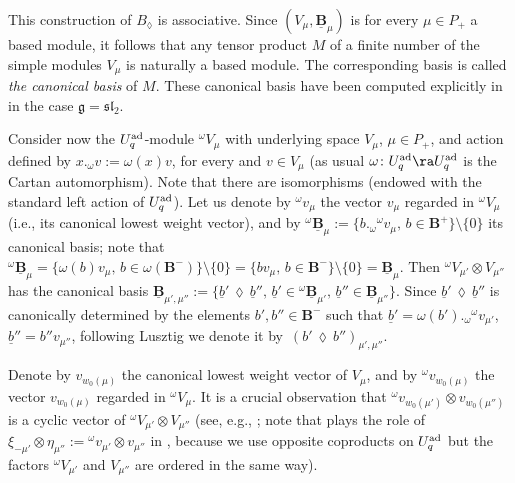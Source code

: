 This construction of $B_{\lozenge}$ is associative. Since $(V_\mu, \underline{\mathbf{B}}_{\mu})$ is for every $\mu\in P_+$ a based module, it follows that any tensor product $M$ of a finite number of the simple modules $V_\mu$ is naturally a based module. The corresponding basis is called {\it the canonical basis} of $M$. These canonical basis have been computed explicitly in \cite{FK} in the case $\mathfrak{g}={\mathfrak{sl}_2}$.

Consider now the $U_q^{\rm ad}$-module ${}^{\omega}V_{\mu}$ with underlying space $V_{\mu}$, $\mu\in P_+$, and action defined by $x._{\omega} v := \omega(x)v$, for every  and $v\in V_{\mu}$ (as usual $\omega\colon U_q^{\rm ad} \ra U_q^{\rm ad}$ is the Cartan automorphism). Note that there are isomorphisms  (endowed with the standard left action of $U_q^{\rm ad}$). Let us denote by ${}^\omega v_\mu$ the vector $v_\mu$ regarded in ${}^{\omega}V_{\mu}$ (i.e., its canonical lowest weight vector), and by ${}^\omega\underline{\mathbf{B}}_{\mu}:=\{b._{\omega}{}^\omega v_{\mu},\, b\in \mathbf{B}^+\}\setminus \{0\}$ its canonical basis; note that ${}^\omega\underline{\mathbf{B}}_{\mu} = \{\omega(b){}v_{\mu},\, b\in \omega(\mathbf{B}^-)\}\setminus \{0\} = \{b v_{\mu},\, b\in \mathbf{B}^-\}\setminus \{0\} = \underline{\mathbf{B}}_{\mu}$. Then ${}^{\omega}V_{\mu'}\otimes V_{\mu''}$ has the canonical basis $\underline{\mathbf{B}}_{\mu',\mu''} := \{\underline{b}'\,\lozenge\, \underline{b}'', \, \underline{b}'\in {}^\omega\underline{\mathbf{B}}_{\mu'},\, \underline{b}''\in \underline{\mathbf{B}}_{\mu''}\}$. Since $\underline{b}'\,\lozenge\, \underline{b}''$ is canonically determined by the elements $b' ,b''\in \mathbf{B}^-$ such that $\underline{b}' = \omega(b')._{\omega} {}^\omega v_{\mu'}$, $\underline{b}'' = b''v_{\mu''}$, following Lusztig we denote it by~${(b' \,\lozenge\, b'')_{\mu',\mu''}}$.

 Denote by $v_{w_0(\mu)}$ the canonical lowest weight vector of $V_{\mu}$, and by ${}^\omega v_{w_0(\mu)}$ the vector $v_{w_0(\mu)}$ regarded in ${}^{\omega}V_{\mu}$. It is a crucial observation that ${}^\omega v_{w_0(\mu')}\otimes v_{w_0(\mu'')}$ is a cyclic vector of ${}^{\omega}V_{\mu'}\otimes V_{\mu''}$ (see, e.g., \cite[Proposition~23.3.6]{Lusztig}; note that  plays the role of $\xi_{-\mu'}\otimes \eta_{\mu''}:= {}^\omega v_{\mu'}\otimes v_{\mu''}$ in \cite{Lusztig}, because we use opposite coproducts on $U_q^{\rm ad}$ but the factors ${}^{\omega}V_{\mu'}$ and $V_{\mu''}$ are ordered in the same way).

